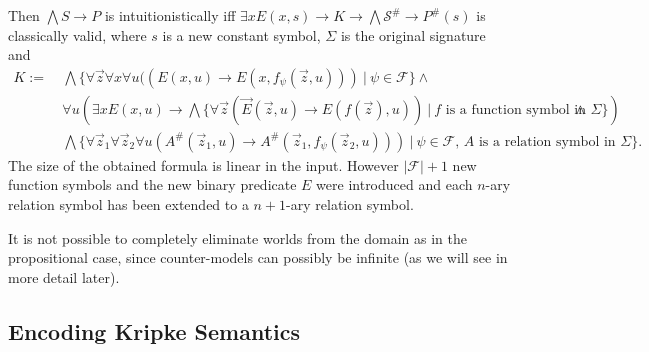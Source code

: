 \documentclass[a4paper,UKenglish,cleveref, autoref, thm-restate]{lipics-v2021}
\begin{document}
\begin{theorem}
\begin{itemize}
	\end{itemize}
	Then $\bigwedge S\to P$ is intuitionistically iff $\exists xE(x, s)\to K\to \bigwedge\mathcal S^\#\to P^\#(s)$ is classically valid, where $s$ is a new constant symbol, $\Sigma$ is the original signature and
	\begin{align*}
		K := &\:\bigwedge\{\forall\vec z\forall x\forall u((E(x, u)\to E(x, f_\psi(\vec z, u)))\:|\:\psi\in\mathcal F\}\wedge\\
		&\:\forall u\left(\exists xE(x, u)\to \bigwedge\{\forall\vec z(\vec E(\vec z, u)\to E(f(\vec z), u))\:|\:\text{$f$ is a function symbol in $\Sigma$}\}\right)\wedge\\
		&\:\bigwedge\{\forall\vec z_1\forall \vec z_2\forall u(A^\#(\vec z_1, u)\to A^\#(\vec z_1, f_\psi(\vec z_2, u)))\:|\:\text{$\psi\in\mathcal F$, $A$ is a relation symbol in $\Sigma$}\}.
	\end{align*}
	The size of the obtained formula is linear in the input. However $|\mathcal F| + 1$ new function symbols and the new binary predicate $E$ were introduced and each $n$-ary relation symbol has been extended to a $n+1$-ary relation symbol.
\end{theorem}

It is not possible to completely eliminate worlds from the domain as in the propositional case, since counter-models can possibly be infinite (as we will see in more detail later).

\subsection{Encoding Kripke Semantics}
\end{document}
